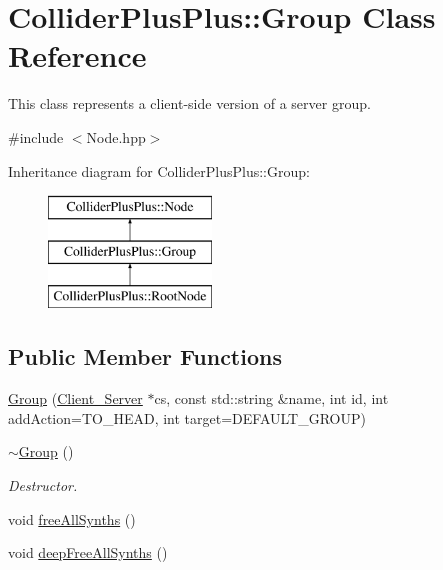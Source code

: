 \hypertarget{classColliderPlusPlus_1_1Group}{\section{Collider\-Plus\-Plus\-:\-:Group Class Reference}
\label{classColliderPlusPlus_1_1Group}
}


This class represents a client-\/side version of a server group.  




{\ttfamily \#include $<$Node.\-hpp$>$}

Inheritance diagram for Collider\-Plus\-Plus\-:\-:Group\-:\begin{figure}[H]
\begin{center}
\leavevmode
\includegraphics[height=3.000000cm]{classColliderPlusPlus_1_1Group}
\end{center}
\end{figure}
\subsection*{Public Member Functions}
\begin{DoxyCompactItemize}
\item 
\hyperlink{classColliderPlusPlus_1_1Group_ae6cc9c4e45c9e707387b3e9b52a3f0af}{Group} (\hyperlink{classColliderPlusPlus_1_1Client__Server}{Client\-\_\-\-Server} $\ast$cs, const std\-::string \&name, int id, int add\-Action=T\-O\-\_\-\-H\-E\-A\-D, int target=D\-E\-F\-A\-U\-L\-T\-\_\-\-G\-R\-O\-U\-P)
\item 
\hypertarget{classColliderPlusPlus_1_1Group_aa7f0bbd9db8735ee8dc5fdfc8c7239cf}{\hyperlink{classColliderPlusPlus_1_1Group_aa7f0bbd9db8735ee8dc5fdfc8c7239cf}{$\sim$\-Group} ()}\label{classColliderPlusPlus_1_1Group_aa7f0bbd9db8735ee8dc5fdfc8c7239cf}

\begin{DoxyCompactList}\small\item\em Destructor. \end{DoxyCompactList}\item 
void \hyperlink{classColliderPlusPlus_1_1Group_a8c19052c483b66455bcaa5fc9e82ee30}{free\-All\-Synths} ()
\item 
void \hyperlink{classColliderPlusPlus_1_1Group_ad19d4e19f0a9c71cfc4e28c587dd5c30}{deep\-Free\-All\-Synths} ()
\end{DoxyCompactItemize}


